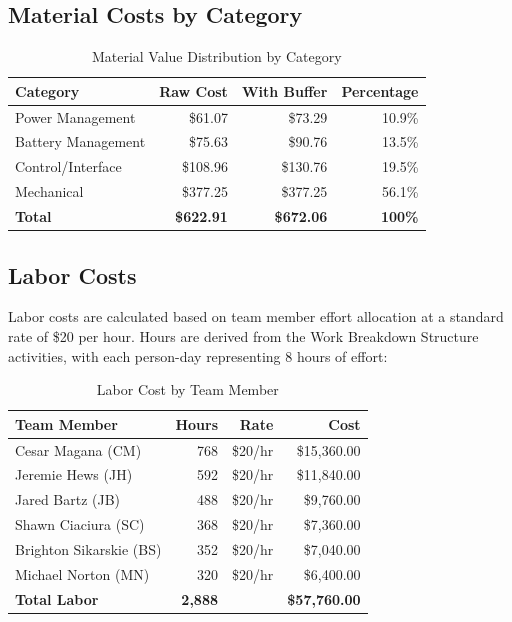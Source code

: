 \subsection{Material Costs by Category}

\begin{table}[H]
\centering
\caption{Material Value Distribution by Category}
\label{tab:material_by_category}
\begin{tabular}{@{}lrrr@{}}
\toprule
\textbf{Category} & \textbf{Raw Cost} & \textbf{With Buffer} & \textbf{Percentage} \\
\midrule
Power Management & \$61.07 & \$73.29 & 10.9\% \\
Battery Management & \$75.63 & \$90.76 & 13.5\% \\
Control/Interface & \$108.96 & \$130.76 & 19.5\% \\
Mechanical & \$377.25 & \$377.25 & 56.1\% \\
\midrule
\textbf{Total} & \textbf{\$622.91} & \textbf{\$672.06} & \textbf{100\%} \\
\bottomrule
\end{tabular}
\end{table}

\subsection{Labor Costs}

Labor costs are calculated based on team member effort allocation at a standard rate of \$20 per hour. Hours are derived from the Work Breakdown Structure activities, with each person-day representing 8 hours of effort:

\begin{table}[H]
\centering
\caption{Labor Cost by Team Member}
\label{tab:labor_costs}
\begin{tabular}{@{}lrrr@{}}
\toprule
\textbf{Team Member} & \textbf{Hours} & \textbf{Rate} & \textbf{Cost} \\
\midrule
Cesar Magana (CM) & 768 & \$20/hr & \$15,360.00 \\
Jeremie Hews (JH) & 592 & \$20/hr & \$11,840.00 \\
Jared Bartz (JB) & 488 & \$20/hr & \$9,760.00 \\
Shawn Ciaciura (SC) & 368 & \$20/hr & \$7,360.00 \\
Brighton Sikarskie (BS) & 352 & \$20/hr & \$7,040.00 \\
Michael Norton (MN) & 320 & \$20/hr & \$6,400.00 \\
\midrule
\textbf{Total Labor} & \textbf{2,888} & & \textbf{\$57,760.00} \\
\bottomrule
\end{tabular}
\end{table}

